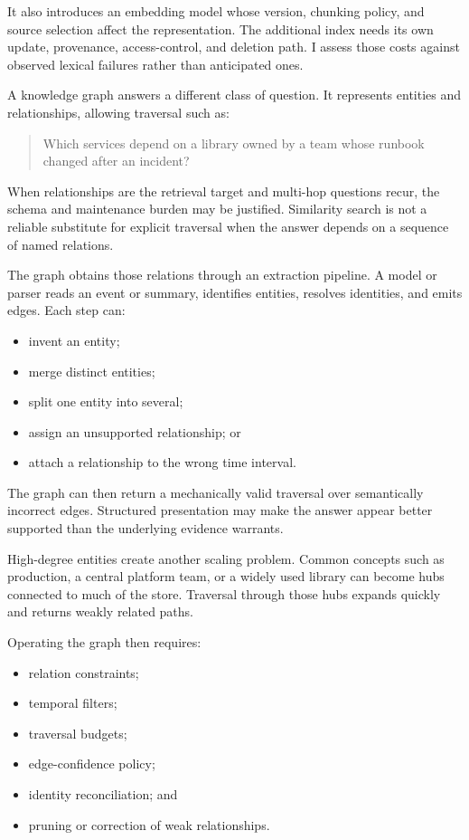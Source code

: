 It also introduces an embedding model whose version, chunking policy, and source selection affect the representation. The additional index needs its own update, provenance, access-control, and deletion path. I assess those costs against observed lexical failures rather than anticipated ones.

A knowledge graph answers a different class of question. It represents entities and relationships, allowing traversal such as:

\begin{quote}
Which services depend on a library owned by a team whose runbook changed after an incident?
\end{quote}

When relationships are the retrieval target and multi-hop questions recur, the schema and maintenance burden may be justified. Similarity search is not a reliable substitute for explicit traversal when the answer depends on a sequence of named relations.

The graph obtains those relations through an extraction pipeline. A model or parser reads an event or summary, identifies entities, resolves identities, and emits edges. Each step can:

\begin{itemize}
\tightlist
\item
  invent an entity;
\item
  merge distinct entities;
\item
  split one entity into several;
\item
  assign an unsupported relationship; or
\item
  attach a relationship to the wrong time interval.
\end{itemize}

The graph can then return a mechanically valid traversal over semantically incorrect edges. Structured presentation may make the answer appear better supported than the underlying evidence warrants.

High-degree entities create another scaling problem. Common concepts such as production, a central platform team, or a widely used library can become hubs connected to much of the store. Traversal through those hubs expands quickly and returns weakly related paths.

Operating the graph then requires:

\begin{itemize}
\tightlist
\item
  relation constraints;
\item
  temporal filters;
\item
  traversal budgets;
\item
  edge-confidence policy;
\item
  identity reconciliation; and
\item
  pruning or correction of weak relationships.
\end{itemize}

